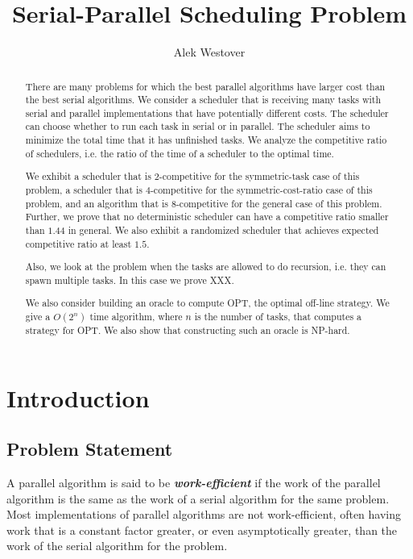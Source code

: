 \documentclass[twocolumn]{article}[10pt]
\author{Alek Westover}
\title{Serial-Parallel Scheduling Problem}
\newcommand{\defn}[1]{{\textit{\textbf{\boldmath #1}}}\xspace}
\begin{document}
\maketitle

\begin{abstract}
  There are many problems for which the best parallel algorithms
  have larger cost than the best serial algorithms. 
  We consider a scheduler that is receiving many tasks with
  serial and parallel implementations that have potentially
  different costs. The scheduler can choose whether to run each
  task in serial or in parallel.
  The scheduler aims to minimize the total time that it has
  unfinished tasks. We analyze the competitive ratio of
  schedulers, i.e. the ratio of the time of a scheduler to the
  optimal time.

  We exhibit a scheduler that is $2$-competitive for the
  symmetric-task case of this problem, a scheduler that is
  $4$-competitive for the symmetric-cost-ratio case of this
  problem, and an algorithm that is $8$-competitive for the
  general case of this problem.
  Further, we prove that no deterministic scheduler can have a competitive
  ratio smaller than $1.44$ in general.
  We also exhibit a randomized scheduler that achieves
  expected competitive ratio at least $1.5$.

  Also, we look at the problem when the tasks are allowed to do
  recursion, i.e. they can spawn multiple tasks. In this case we
  prove XXX.

  We also consider building an oracle to compute OPT, the optimal
  off-line strategy. We give a $O(2^n)$ time algorithm, where $n$
  is the number of tasks, that computes a strategy for OPT. We
  also show that constructing such an oracle is NP-hard.

\end{abstract}

\section{Introduction}
\subsection{Problem Statement}
A parallel algorithm is said to be \defn{work-efficient} if the
work of the parallel algorithm is the same as the work of a
serial algorithm for the same problem. Most implementations of
parallel algorithms are not work-efficient, often having work
that is a constant factor greater, or even asymptotically
greater, than the work of the serial algorithm for the problem.
\end{document}
